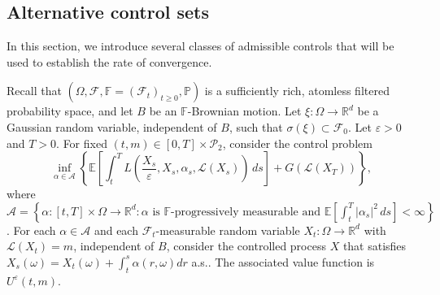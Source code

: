 \documentclass[reqno,11pt]{amsart}
\numberwithin{equation}{section}
\newcommand{\e}{\varepsilon}
\newcommand{\ep}{\varepsilon}
\begin{document}
\subsection{Alternative control sets}\label{altcontrset}

In this section, we introduce several classes of admissible controls that will be used to establish the rate of convergence.

Recall that $(\Omega, \mathcal{F}, \mathbb{F}=(\mathcal{F}_t)_{t\geq 0},\mathbb{P})$ is a sufficiently rich, atomless filtered probability space, and let $B$ be an $\mathbb{F}$-Brownian motion. Let $\xi:\Omega \to \mathbb{R}^d$ be a Gaussian random variable, independent of $B$, such that $\sigma(\xi) \subset \mathcal{F}_0$. Let $\ep>0$ and $T>0$. For fixed $(t,m) \in [0,T] \times \mathcal{P}_2$, consider the control problem
\begin{equation} \label{eqn:control}
\inf_{\alpha\in \mathcal{A}} \left\{\mathbb{E}\left[\int_t^T L \left(\frac{X_s}{\ep},X_s,\alpha_s, \mathcal{L}(X_s)\right)\,ds\right]+G(\mathcal{L}(X_T))\right\},
\end{equation}
where $\mathcal{A}=\left\{ \alpha : [t,T]\times \Omega \to \mathbb{R}^d :
\alpha \text{ is } \mathbb{F}\text{-progressively measurable and } \mathbb{E}\left[ \int_t^T|\alpha_s|^2 \, ds \right] <\infty\right\}$. For each $\alpha \in \mathcal{A}$ and each $\mathcal{F}_t$-measurable random variable
$X_t : \Omega \to \mathbb{R}^d$ with $\mathcal{L}(X_t)=m$, independent of $B$, consider the controlled process $X$ that satisfies $X_s(\omega)=X_t(\omega)+\int_t^s \alpha(r,\omega)dr$ a.s.. The associated value function is $U^\e(t,m)$.


\end{document}
